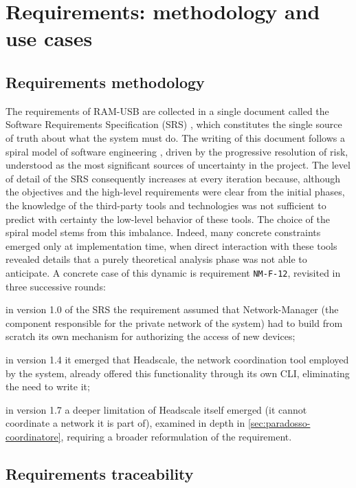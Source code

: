 \chapter{Requirements: methodology and use cases}
\label{chap:requisiti}

\section{Requirements methodology}

The requirements of RAM-USB are collected in a single document called the Software Requirements
Specification (SRS) \cite{ramusb-srs},
which constitutes the single source of truth about what the system must do.
The writing of this document follows a spiral model of software engineering \cite{Boehm88},
driven by the progressive resolution of risk, understood as the most significant sources of uncertainty
in the project.
The level of detail of the SRS consequently increases at every iteration because, although
the objectives and the high-level requirements were clear from the initial phases, the knowledge of the
third-party tools and technologies was not sufficient to predict with certainty the low-level behavior
of these tools. The choice of the spiral model stems from this imbalance.
Indeed, many concrete constraints emerged only at implementation time, when direct
interaction with these tools revealed details that a purely theoretical analysis phase was not
able to anticipate.
A concrete case of this dynamic is requirement \texttt{NM-F-12}, revisited in three successive rounds:

in version 1.0 of the SRS \cite{ramusb-commit-nm-f-12-v1} the requirement assumed that Network-Manager (the
component responsible for the private network of the system) had to build from scratch its own mechanism
for authorizing the access of new devices;

in version 1.4 \cite{ramusb-commit-nm-f-12-cli} it emerged that Headscale, the network coordination
tool employed by the system, already offered this functionality through its own
CLI, eliminating the need to write it;

in version 1.7 \cite{ramusb-commit-nm-f-12-14-rework} a deeper limitation of Headscale itself emerged
(it cannot coordinate a network it is part of), examined in depth in
\autoref{sec:paradosso-coordinatore}, requiring a broader reformulation of the requirement.

\section{Requirements traceability}

